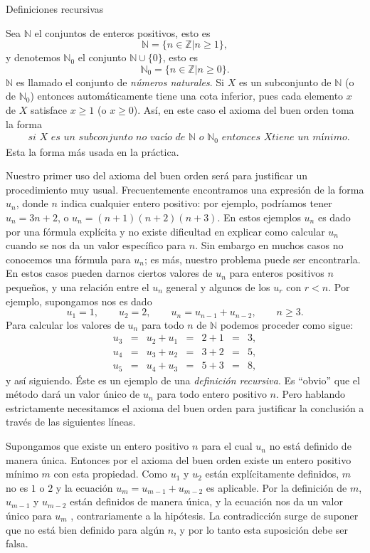 \begin{section}{Definiciones recursivas}\label{1.3}

Sea $\mathbb N$ el conjuntos de enteros positivos, esto es
$$
\mathbb N = \{ n \in \mathbb Z | n\ge 1\},
$$
y denotemos $\mathbb N_0$ el conjunto $\mathbb N \cup \{0\}$, esto
es
$$
\mathbb N_0 = \{ n \in \mathbb Z | n\ge 0\}.
$$
$\mathbb{N}$  es llamado el conjunto de  \textit{números naturales}. Si $X$ es un subconjunto de $\mathbb N$ (o de $\mathbb N_0$)  entonces automáticamente tiene una cota inferior, pues cada elemento $x$ de $X$ satisface $x\ge 1$ (o $x\ge 0$). As{í}, en este caso el axioma del buen orden toma la forma
$$
\begin{aligned}
&\textit{si $X$ es un subconjunto no vacío de $\mathbb N$ o $\mathbb N_0$ entonces $X$
 tiene un mínimo.}
\end{aligned}
$$
Esta la forma más usada en la práctica.

Nuestro primer uso del axioma del buen orden será para justificar un procedimiento muy usual. Frecuentemente encontramos una expresión de la forma $u_n$, donde $n$ indica cualquier entero positivo: por ejemplo, podríamos tener $u_n=3n+2$, o $u_n = (n+1)(n+2)(n+3)$. En estos ejemplos $u_n$ es dado por una fórmula explícita y no existe dificultad en explicar como calcular $u_n$ cuando se nos da un valor específico para $n$. Sin embargo en muchos casos no conocemos una fórmula para $u_n$; es más, nuestro problema puede ser encontrarla. En estos casos pueden darnos ciertos valores de $u_n$ para enteros positivos $n$ peque\~nos, y una relación entre el $u_n$ general y algunos de los $u_r$ con $r<n$. Por ejemplo, supongamos nos es dado 
$$ 
u_1=1, \qquad u_2=2, \qquad u_n =u_{n-1} +u_{n-2}, \qquad n\ge 3.
$$
Para calcular los valores de $u_n$ para todo $n$ de $\mathbb N$ podemos proceder como sigue:
$$
\begin{matrix}
u_3 & = & u_2 + u_1 & = & 2+1 &=& 3, \\
u_4 & = & u_3 + u_2 & = & 3+2 &=& 5, \\
u_5 & = & u_4 + u_3 & = & 5+3 &=& 8,
\end{matrix}
$$
y así siguiendo.  Éste es un ejemplo de una \textit{definición recursiva}. Es ``obvio'' que el método dará un valor único de $u_n$ para todo entero positivo $n$. Pero hablando estrictamente necesitamos el axioma del buen orden para justificar la conclusión a través de las siguientes líneas.

Supongamos que existe un entero positivo $n$ para el cual $u_n$ no está definido de manera única. Entonces por el axioma del buen orden existe un entero positivo mínimo $m$ con esta propiedad. Como $u_1$ y $u_2$ están explícitamente definidos, $m$ no es $1$ o $2$ y la ecuación $u_m =u_{m-1} +u_{m-2}$ es aplicable. Por la definición de $m$, $u_{m-1}$ y $u_{m-2}$ están definidos de manera única, y la ecuación nos da un valor único para $u_m$ , contrariamente a la hipótesis. La contradicción surge de suponer que no está bien definido para algún $n$, y por lo tanto esta suposición debe ser falsa.


\end{section}
